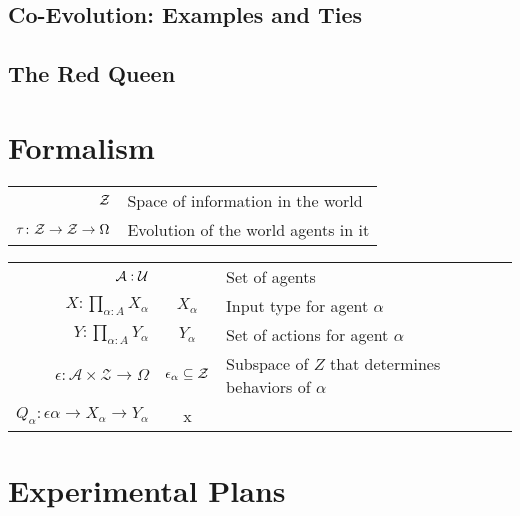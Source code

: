 \documentclass{article}
\theoremstyle{definition}
\newcommand{\Z}{\mathcal Z}
\begin{document}
	\subsection{Co-Evolution: Examples and Ties}
	\subsection{The Red Queen}
	
	\section{Formalism}%
	
	\begin{tabular}{r|l}
		$\cal Z$ & Space of information in the world \\
		$\tau\colon {\cal Z \to Z} \to \Omega$ & Evolution of the world agents in it \\
	\end{tabular}
	\vspace{1em}
	
	
	\begin{tabular}{r|c|l}		
		$\cal A : U$ && Set of agents \\[0.3em]
		$\displaystyle X\colon \prod_{\alpha: A} X_\alpha$ & $X_\alpha$ & Input type for agent $\alpha$ \\[1.7em]
		$\displaystyle Y\colon \prod_{\alpha: A} Y_\alpha$ &$Y_\alpha$ & Set of actions for agent $\alpha$ \\
		$\displaystyle \epsilon\colon \mathcal A \times \Z \to \Omega $&$\epsilon_\alpha \subseteq \cal Z$ & Subspace of $Z$ that determines behaviors of $\alpha$ \\
		$Q_\alpha\colon \epsilon\alpha \to X_\alpha \to Y_\alpha$ & x 
	\end{tabular}

	\section{Experimental Plans}
	
\end{document}
